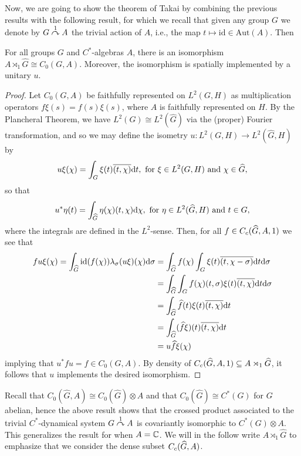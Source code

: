 Now, we are going to show the theorem of Takai by combining the previous results with the following result, for which we recall that given any group $G$ we denote by $G \stackrel{1}{\curvearrowright} A$ the trivial action of $A$, i.e., the map $t \mapsto \mathrm{id} \in \mathrm{Aut}(A)$. Then
\begin{lemma}
For all groups $G$ and $C^*$-algebras $A$, there is an isomorphism $A \rtimes_1 \hat G \cong C_0(G,A)$. Moreover, the isomorphism is spatially implemented by a unitary $u$.
\label{takai:trivcrossiso}
\end{lemma}
\begin{proof}
Let $C_0(G,A)$ be faithfully represented on $L^2(G,H)$ as multiplication operators $f \xi(s) = f(s) \xi(s)$, where $A$ is faithfully represented on $H$. By the Plancheral Theorem, we have $L^2(G) \cong L^2(\hat G)$ via the (proper) Fourier transformation, and so we may define the isometry $u \colon L^2(G,H) \to L^2(\hat G,H)$ by
\begin{align*}
	u \xi(\chi) = \int_G \xi(t) \overline{(t, \chi)} \mathrm{d} t, \text{ for } \xi \in L^2(G,H) \text{ and } \chi \in \widehat{G},
\end{align*}
so that 
\begin{align*}
	u^* \eta (t) = \int_{\widehat{G}} \eta(\chi) (t, \chi) \mathrm{d} \chi, \text{ for } \eta \in L^2(\widehat{G},H) \text{ and } t \in G,
\end{align*}
where the integrals are defined in the $L^2$-sense. Then, for all $f \in C_c(\widehat{G}, A,1)$ we see that
\begin{align*}
	f u \xi(\chi) = \int_{\widehat{G}} \mathrm{id}(f(\chi)) \lambda_\sigma (u \xi)(\chi) \mathrm{d} \sigma &= \int_{\widehat{G}} f(\chi) \int_G \xi(t) \overline{(t,\chi - \sigma)} \mathrm{d} t \mathrm{d} \sigma\\
	&= \int_{\widehat{G}}\int_G f(\chi)(t, \sigma) \xi(t) \overline{(t, \chi)} \mathrm{d} t \mathrm{d} \sigma\\
	&= \int_{\widehat{G}} \widehat{f}(t) \xi(t) \overline{(t, \chi)} \mathrm{d} t\\
	&= \int_{\widehat{G}} (\widehat{f} \xi)(t) \overline{(t, \chi)} \mathrm{d} t\\
	&= u \widehat{f} \xi(\chi)
\end{align*}
implying that $u^* f u = \hat f \in C_0(G, A)$. By density of $C_c(\widehat{G}, A, 1) \subseteq A \rtimes_1 \widehat{G}$, it follows that $u$ implements the desired isomorphism.
\end{proof}
\begin{remark}
	Recall that $C_0(\hat G, A) \cong C_0(\hat G) \otimes A$ and that $C_0(\hat G) \cong C^*(G)$ for $G$ abelian, hence the above result shows that the crossed product associated to the trivial $C^*$-dynamical system $G \stackrel{1}{\curvearrowright} A$ is covariantly isomorphic to $C^*(G) \otimes A$. This generalizes the result for when $A = \mathbb{C}$. We will in the follow write $A \rtimes_1 \hat G$ to emphasize that we consider the dense subset $C_c(\widehat{G}, A)$.
\end{remark}
